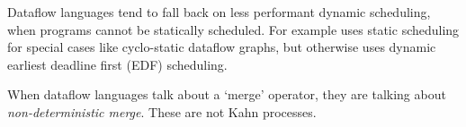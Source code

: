 Dataflow languages tend to fall back on less performant dynamic scheduling, when programs cannot be statically scheduled.
For example \citet{bouakaz2013real} uses static scheduling for special cases like cyclo-static dataflow graphs, but otherwise uses dynamic earliest deadline first (EDF) scheduling.

When dataflow languages talk about a `merge' operator, they are talking about \emph{non-deterministic merge}. These are not Kahn processes.

